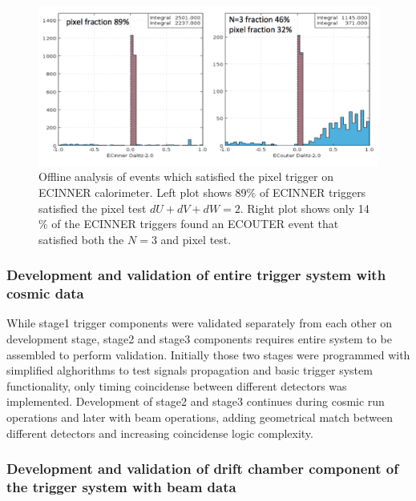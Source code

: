 \begin{figure}[!htb]
 \centering
  \includegraphics[width=1.0\columnwidth,keepaspectratio]{img/PixelFraction.png}
 \caption{Offline analysis of events which satisfied the pixel trigger on ECINNER calorimeter.  Left plot shows 89$\%$ of ECINNER triggers satisfied the pixel test $dU+dV+dW=2$.  Right plot shows only 14$\%$ of the ECINNER triggers found an ECOUTER event that satisfied both the $N=3$ and pixel test. }
\end{figure}

\subsubsection{Development and validation of entire trigger system with cosmic data} 

While stage1 trigger components were validated separately from each other on development stage, stage2 and stage3 components requires entire system to be assembled to perform validation. Initially those two stages were programmed with simplified alghorithms to test signals propagation and basic trigger system functionality, only timing coincidense between different detectors was implemented. Development of stage2 and stage3 continues during cosmic run operations and later with beam operations, adding geometrical match between different detectors and increasing coincidense logic complexity.

\subsubsection{Development and validation of drift chamber component of the trigger system with beam data}



